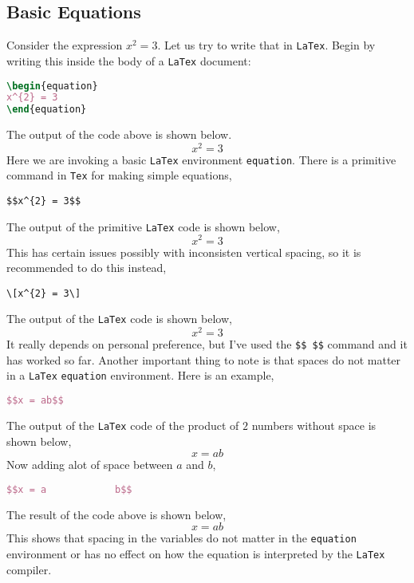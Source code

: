 \documentclass[a4paper, 12pt]{report}
\begin{document}
\begin{center}
\section{Basic Equations}
\begin{comment}
\end{comment}
Consider the expression $x^{2} = 3$. Let us try to write that in \texttt{LaTex}. Begin by writing this inside the body of a \texttt{LaTex} document:
\begin{lstlisting}[language=tex]
\begin{equation}
x^{2} = 3
\end{equation}
\end{lstlisting}
The output of the code above is shown below. 
\begin{equation}
x^{2} = 3
\end{equation}
Here we are invoking a basic \texttt{LaTex} environment \texttt{equation}. There is a primitive command in \texttt{Tex} for making simple equations,
\begin{lstlisting}[language=Tex]
$$x^{2} = 3$$
\end{lstlisting}
The output of the primitive \texttt{LaTex} code is shown below,
$$x^{2} = 3$$
This has certain issues possibly with inconsisten vertical spacing, so it is recommended to do this instead,
\begin{lstlisting}[language=Tex]
\[x^{2} = 3\]
\end{lstlisting}
The output of the \texttt{LaTex} code is shown below,
\[x^{2} = 3\]
It really depends on personal preference, but I've used the \texttt{\$\$ \$\$} command and it has worked so far. Another important thing to note is that spaces do not matter in a \texttt{LaTex} \texttt{equation} environment. Here is an example,
\begin{lstlisting}[language=tex]
$$x = ab$$
\end{lstlisting}
The output of the \texttt{LaTex} code of the product of $2$ numbers without space is shown below,
$$x = ab$$
Now adding alot of space between $a$ and $b$,
\begin{lstlisting}[language=tex]
$$x = a            b$$
\end{lstlisting}
The result of the code above is shown below,
$$x = a            b$$
This shows that spacing in the variables do not matter in the \texttt{equation} environment or has no effect on how the equation is interpreted by the \texttt{LaTex} compiler.


\end{center}
\end{document}

